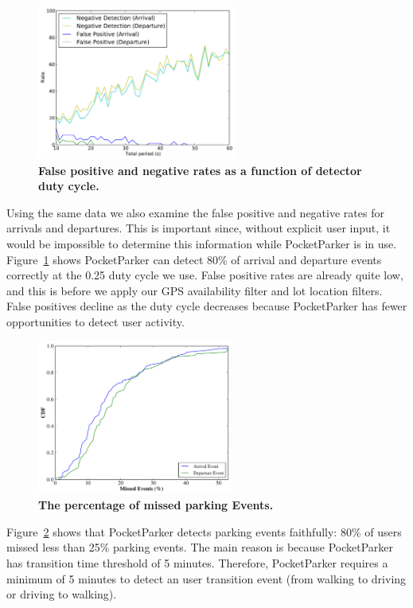 \begin{figure}
\centering
\includegraphics[height=2in,width=\columnwidth]{./figures/Rate_FP_and_ND.pdf}

\caption{\textbf{False positive and negative rates as a function of detector
duty cycle.}} 

\label{fig-falsepositives}
\end{figure}

Using the same data we also examine the false positive and negative rates for
arrivals and departures. This is important since, without explicit user
input, it would be impossible to determine this information while
PocketParker is in use. Figure~\ref{fig-falsepositives} shows PocketParker
can detect 80\% of arrival and departure events correctly at the 0.25 duty
cycle we use. False positive rates are already quite low, and this is before
we apply our GPS availability filter and lot location filters. False
positives decline as the duty cycle decreases because PocketParker has fewer
opportunities to detect user activity.

\begin{figure}[t]
\centering
\includegraphics[height=2in,width=\columnwidth]{./figures/MissedEvents_CDF.pdf}

\caption{\textbf{The percentage of missed parking Events.}}

\label{fig-missedevents}
\end{figure}

Figure~\ref{fig-missedevents} shows that PocketParker detects parking events 
faithfully: 80\% of users missed less than 25\% parking events. The main reason 
is because PocketParker has transition time threshold of 5 minutes. Therefore, 
PocketParker requires a minimum of 5 minutes to detect an user transition event
(from walking to driving or driving to walking). 

